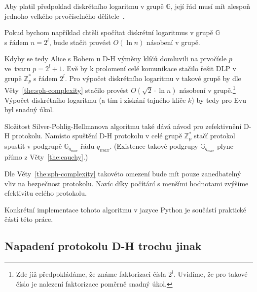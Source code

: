 \documentclass[
  program=infoi,
  biblatex=false,
  figures=true,
  glossaries,
  tables=false,
  sourcecodes=true,
  index
]{kidiplom}
\begin{document}
        
            \begin{consequence}
                Aby platil předpoklad diskrétního logaritmu v grupě $\mathbb{G}$, její řád musí mít alespoň
                jednoho velkého prvočíselného dělitele~\cite{graduate-course}.
            \end{consequence}

            Pokud bychom například chtěli spočítat diskrétní logaritmus v grupě $\mathbb{G}$ \\ s řádem $n = 2^l$, bude
            stačit provést $O(\ln{n})$ násobení v grupě.

            Kdyby se tedy Alice s Bobem u D-H výměny klíčů domluvili na prvočísle $p$ ve~tvaru $p = 2^l + 1$.
            Evě by k prolomení celé komunikace stačilo řešit DLP v grupě $\mathbb{Z}^*_p$ s řádem $2^l$.
            Pro výpočet diskrétního logaritmu v takové grupě by dle Věty~\ref{the:sph-complexity} stačilo provést
            $O(\sqrt{2} \cdot \ln{n})$ násobení v grupě.\footnote{Zde již předpokládáme, že známe faktorizaci čísla $2^l$.
            Uvidíme, že pro takové číslo je nalezení faktorizace poměrně snadný úkol.}
            Výpočet diskrétního logaritmu (a tím i získání tajného klíče $k$) by tedy pro Evu byl snadný úkol.

            \begin{remark}\label{rem:d-h-improved}
                
                Složitost Silver-Pohlig-Hellmanova algoritmu také dává návod pro zefektivnění D-H protokolu.
                Namísto spuštění D-H protokolu v celé grupě $\mathbb{Z}^*_p$ stačí protokol spustit
                v podgrupě $\mathbb{G}_{q_{max}}$ řádu $q_{max}$.
                (Existence takové podgrupy $\mathbb{G}_{q_{max}}$ plyne přímo z Věty~\ref{the:cauchy}.)

                Dle Věty~\ref{the:sph-complexity} takovéto omezení bude mít pouze zanedbatelný vliv na bezpečnost protokolu.
                Navíc díky počítání s menšími hodnotami zvýšíme efektivitu celého protokolu.

            \end{remark}

            Konkrétní implementace tohoto algoritmu v jazyce Python je součástí praktické části této práce.

        

\subsection{Napadení protokolu D-H trochu jinak}\label{sub:d-h-mallory}
\end{document}
